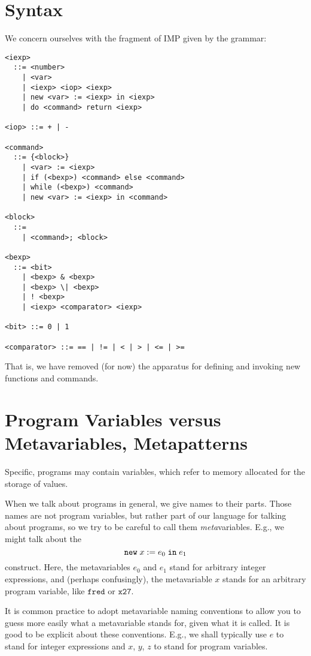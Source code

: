 \documentclass{article}
\begin{document}
\section{Syntax}

We concern ourselves with the fragment of IMP given by the grammar:

\begin{verbatim}
<iexp>
  ::= <number>
    | <var>
    | <iexp> <iop> <iexp>
    | new <var> := <iexp> in <iexp>
    | do <command> return <iexp>

<iop> ::= + | -

<command>
  ::= {<block>}
    | <var> := <iexp>
    | if (<bexp>) <command> else <command>
    | while (<bexp>) <command>
    | new <var> := <iexp> in <command>

<block>
  ::=
    | <command>; <block>

<bexp>
  ::= <bit>
    | <bexp> & <bexp>
    | <bexp> \| <bexp>
    | ! <bexp>
    | <iexp> <comparator> <iexp>

<bit> ::= 0 | 1

<comparator> ::= == | != | < | > | <= | >=
\end{verbatim}

That is, we have removed (for now) the apparatus for defining and invoking new functions and commands.


\section{Program Variables versus Metavariables, Metapatterns}

Specific, programs may contain variables, which refer to memory allocated for the storage of values.

When we talk about programs in general, we give names to their parts. Those names are not program variables, but rather part of our language for talking about programs, so we try to be careful to call them \emph{meta}variables. E.g., we might talk about the
\[
  \mathtt{new}\;x\;\mathtt{:=}\;e_0\;\mathtt{in}\;e_1
\]
construct. Here, the metavariables $e_0$ and $e_1$ stand for arbitrary integer expressions, and (perhaps confusingly), the metavariable $x$ stands for an arbitrary program variable, like $\mathtt{fred}$ or $\mathtt{x27}$.

It is common practice to adopt metavariable naming conventions to allow you to guess more easily what a metavariable stands for, given what it is called. It is good to be explicit about these conventions. E.g., we shall typically use $e$ to stand for integer expressions and $x$, $y$, $z$ to stand for program variables.
\end{document}
